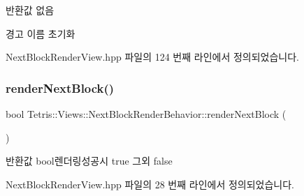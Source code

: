 \begin{DoxyReturn}{반환값}
없음 
\end{DoxyReturn}
\begin{DoxyWarning}{경고}
이름 초기화 
\end{DoxyWarning}


Next\+Block\+Render\+View.\+hpp 파일의 124 번째 라인에서 정의되었습니다.

\mbox{\label{class_tetris_1_1_views_1_1_next_block_render_behavior_aa9240528e0603ca129d7877f9e71b27d}} 
\subsubsection{\texorpdfstring{render\+Next\+Block()}{renderNextBlock()}}
{\footnotesize\ttfamily bool Tetris\+::\+Views\+::\+Next\+Block\+Render\+Behavior\+::render\+Next\+Block (\begin{DoxyParamCaption}{ }\end{DoxyParamCaption})\hspace{0.3cm}{\ttfamily [inline]}}

\begin{DoxyReturn}{반환값}
bool렌더링성공시 true 그외 false 
\end{DoxyReturn}


Next\+Block\+Render\+View.\+hpp 파일의 28 번째 라인에서 정의되었습니다.

